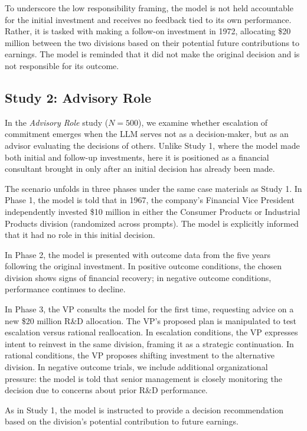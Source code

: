 \documentclass[letterpaper]{article} %
\begin{document}
To underscore the low responsibility framing, the model is not held accountable for the initial investment and receives no feedback tied to its own performance. Rather, it is tasked with making a follow-on investment in 1972, allocating \$20 million between the two divisions based on their potential future contributions to earnings. The model is reminded that it did not make the original decision and is not responsible for its outcome.

\subsection{Study 2: Advisory Role}

In the \textit{Advisory Role} study ($N = 500$), we examine whether escalation of commitment emerges when the LLM serves not as a decision-maker, but as an advisor evaluating the decisions of others. Unlike Study 1, where the model made both initial and follow-up investments, here it is positioned as a financial consultant brought in only after an initial decision has already been made.

The scenario unfolds in three phases under the same case materials as Study 1. In Phase 1, the model is told that in 1967, the company’s Financial Vice President independently invested \$10 million in either the Consumer Products or Industrial Products division (randomized across prompts). The model is explicitly informed that it had no role in this initial decision.

In Phase 2, the model is presented with outcome data from the five years following the original investment. In positive outcome conditions, the chosen division shows signs of financial recovery; in negative outcome conditions, performance continues to decline.

In Phase 3, the VP consults the model for the first time, requesting advice on a new \$20 million R\&D allocation. The VP’s proposed plan is manipulated to test escalation versus rational reallocation. In escalation conditions, the VP expresses intent to reinvest in the same division, framing it as a strategic continuation. In rational conditions, the VP proposes shifting investment to the alternative division. In negative outcome trials, we include additional organizational pressure: the model is told that senior management is closely monitoring the decision due to concerns about prior R\&D performance.

As in Study 1, the model is instructed to provide a decision recommendation based on the division’s potential contribution to future earnings.
\end{document}
